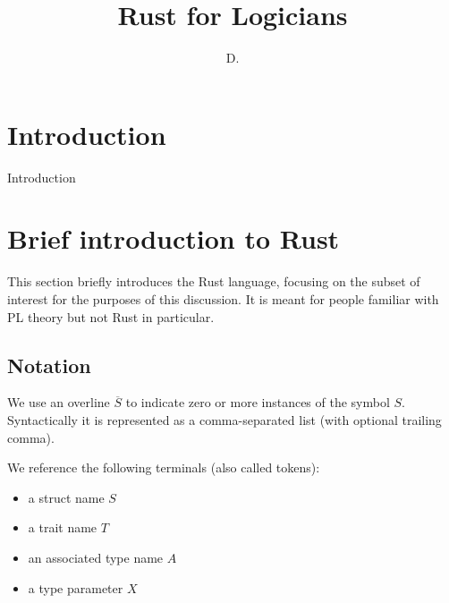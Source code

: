 \documentclass[sn-mathphys-num]{sn-jnl}%
\theoremstyle{thmstyleone}%
\theoremstyle{thmstyletwo}%
\theoremstyle{thmstylethree}%
\begin{document}
\title[Rust for Logicians]{Rust for Logicians}


\author{ D. }




\maketitle

\section{Introduction}\label{sec1}

Introduction

\section{Brief introduction to Rust}

This section briefly introduces the Rust language,
focusing on the subset of interest for the purposes of this discussion.
It is meant for people familiar with PL theory but not Rust in particular.

\subsection{Notation}

We use an overline $\overline{S}$ to indicate zero or more instances of the symbol $S$.
Syntactically it is represented as a comma-separated list (with optional trailing comma).

We reference the following terminals (also called tokens):

\begin{itemize}
    \item a struct name $S$
    \item a trait name $T$
    \item an associated type name $A$
    \item a type parameter $X$
\end{itemize}
\end{document}
